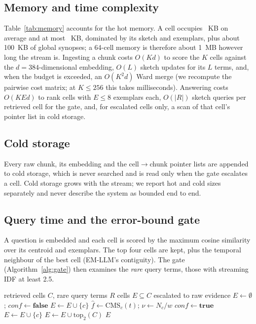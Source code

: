 \documentclass[conference,10pt]{IEEEtran}
\begin{document}
\subsection{Memory and time complexity}

Table~\ref{tab:memory} accounts for the hot memory. A cell occupies \CellKBMean{}~KB on average and at most
\CellKBMax{}~KB, dominated by its sketch and exemplars, plus about 100~KB of global synopses; a 64-cell memory is
therefore about 1~MB however long the stream is. Ingesting a chunk costs $O(Kd)$ to score the $K$ cells against the
$d{=}384$-dimensional embedding, $O(L)$ sketch updates for its $L$ terms, and, when the budget is exceeded, an $O(K^2 d)$
Ward merge (we recompute the pairwise cost matrix; at $K\le256$ this takes milliseconds). Answering costs $O(K E d)$ to
rank cells with $E\le 8$ exemplars each, $O(|R|)$ sketch queries per retrieved cell for the gate, and, for escalated
cells only, a scan of that cell's pointer list in cold storage.

\subsection{Cold storage}
Every raw chunk, its embedding and the cell$\rightarrow$chunk pointer lists are appended to cold storage, which is never
searched and is read only when the gate escalates a cell. Cold storage grows with the stream; we report hot and cold
sizes separately and never describe the system as bounded end to end.

\subsection{Query time and the error-bound gate}
A question is embedded and each cell is scored by the maximum cosine similarity over its centroid and exemplars. The
top four cells are kept, plus the temporal neighbour of the best cell (EM-LLM's contiguity). The gate
(Algorithm~\ref{alg:gate}) then examines the \emph{rare} query terms, those with streaming IDF at least 2.5.

\begin{algorithm}[t]
\caption{Error-bound gate for one query}\label{alg:gate}
\begin{algorithmic}[1]
\Require retrieved cells $C$, rare query terms $R$
\Ensure cells $E\subseteq C$ escalated to raw evidence
\State $E\gets\emptyset$; $\mathit{conf}\gets\mathbf{false}$
   
    \State $E\gets E\cup\{c\}$
  \EndIf
    \State $\hat f\gets \mathrm{CMS}_c(t)$;\; $\nu\gets N_c/w$
     $\mathit{conf}\gets\mathbf{true}$ \EndIf
     
      \State $E\gets E\cup\{c\}$
    \EndIf
  \EndFor
\EndFor
{} 
  \State $E\gets E\cup\mathrm{top}_2(C)$
\EndIf
\State \Return $E$
\end{algorithmic}
\end{algorithm}
\end{document}

